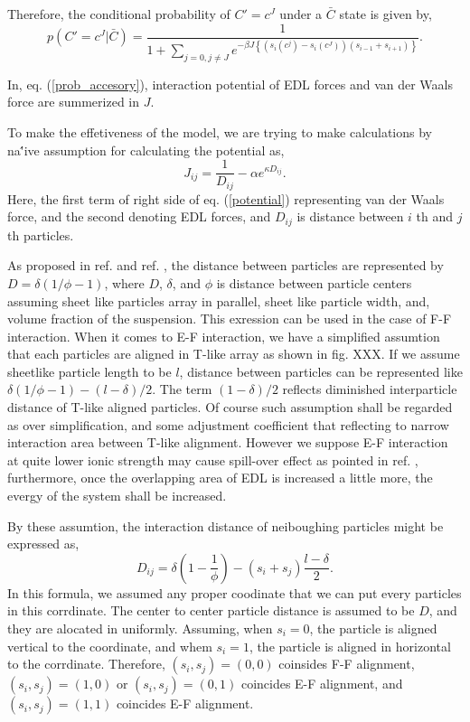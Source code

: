 \documentclass{article}
\begin{document}
Therefore, the conditional probability of $C' = c^J$ under a $\bar{C}$ state is given by,
\begin{equation}
 p (C' = c^J|\bar{C}) = \frac{1}{1+\sum_{j=0, j\not= J}e^{-\beta J \left\{(s_i (c^j) - s_i (c^J))(s_{i-1} + s_{i+1})\right\}}}. 
  \label{prob_accesory}
\end{equation}

In, eq. (\ref{prob_accesory}), interaction potential of EDL forces and van der Waals force are summerized in $J$.

To make the effetiveness of the model, we are trying to make calculations by na\''{i}ve assumption for calculating the potential as,
\begin{equation}
 J_{ij} = \frac{1}{D_{ij}} - \alpha e^{\kappa D_{ij}}.   \label{potential}
\end{equation}
Here, the first term of right side of eq. (\ref{potential}) representing van der Waals force, and the second denoting EDL forces, and $D_{ij}$ is 
distance between $i$ th and $j$ th particles.

As proposed in ref. \cite{adachi} and ref. \cite{sakairi}, the distance between particles are represented by $D = \delta (1/\phi - 1)$,
where $D$, $\delta$, and $\phi$ is distance between particle centers assuming sheet like particles array in parallel, sheet like particle width,
 and, volume fraction of the suspension. This exression can be used in the case of F-F interaction. 
When it comes to E-F interaction, we have a simplified assumtion that each particles are aligned in T-like array as shown in fig. XXX.
If we assume sheetlike particle length to be $l$, distance between particles can be represented like $\delta (1/\phi - 1) - (l-\delta)/2$.
The term $(1-\delta)/2$ reflects diminished interparticle distance of T-like aligned particles.
Of course such assumption shall be regarded as over simplification, and some adjustment coefficient that reflecting to narrow interaction area
between T-like alignment. However we suppose E-F interaction at quite lower ionic strength may cause spill-over effect as pointed in ref. \cite{sposito},
furthermore, once the overlapping area of EDL is increased a little more, the evergy of the system shall be increased.

By these assumtion, the interaction distance of neiboughing particles might be expressed as,
\begin{equation}
 D_{ij} = \delta\left(1 - \frac{1}{\phi}\right) - (s_i + s_j)\frac{l-\delta}{2}.  \label{distance}
\end{equation}
In this formula, we assumed any proper coodinate that we can put every particles in this corrdinate.
The center to center particle distance is assumed to be $D$, and they are alocated in uniformly.
Assuming, when $s_i = 0$, the particle is aligned vertical to the coordinate, and whem $s_i = 1$, the particle is aligned in horizontal to the corrdinate.
Therefore, $(s_i, s_j) = (0, 0)$ coinsides F-F alignment,  $(s_i, s_j) = (1, 0)$ or $(s_i, s_j) = (0, 1)$ coincides E-F alignment, and $(s_i, s_j) = (1, 1)$ coincides E-F alignment.
\end{document}
